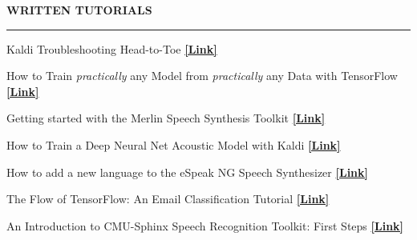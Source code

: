 \documentclass{resume} %
\begin{document}


\begin{minipage}{\textwidth}
\sectionskip
\MakeUppercase{\textbf{Written Tutorials}}
  \sectionlineskip
  \hrule
\vspace{.5cm}

{Kaldi Troubleshooting Head-to-Toe} \hfill \href{http://jrmeyer.github.io/asr/2019/08/17/Kaldi-troubleshooting.html}{\textbf{[Link]}}%

\vspace{.25cm}

{How to Train \textit{practically} any Model from \textit{practically} any Data with TensorFlow} \hfill \href{http://jrmeyer.github.io/machinelearning/2019/05/29/tensorflow-dataset-estimator-api.html}{\textbf{[Link]}}%

\vspace{.25cm}

{Getting started with the Merlin Speech Synthesis Toolkit} \hfill \href{http://jrmeyer.github.io/tts/2017/02/14/Installing-Merlin.html}{\textbf{[Link]}}%
\vspace{.25cm}

{How to Train a Deep Neural Net Acoustic Model with Kaldi} \hfill \href{http://jrmeyer.github.io/asr/2016/12/15/DNN-AM-Kaldi.html}{\textbf{[Link]}}%
\vspace{.25cm}

{How to add a new language to the eSpeak NG Speech Synthesizer} \hfill \href{http://jrmeyer.github.io/tts/2016/07/03/How-to-Add-a-Language-to-eSpeak-NG.html}{\textbf{[Link]}}%
\vspace{.25cm}

{The Flow of TensorFlow: An Email Classification Tutorial} \hfill \href{http://jrmeyer.github.io/machinelearning/2016/02/01/TensorFlow-Tutorial.html}{\textbf{[Link]}}%
\vspace{.25cm}

{An Introduction to CMU-Sphinx Speech Recognition Toolkit: First Steps} \hfill \href{http://jrmeyer.github.io/asr/2016/01/09/Installing-CMU-Sphinx-on-Ubuntu.html}{\textbf{[Link]}}%

\end{minipage}
\end{document}

